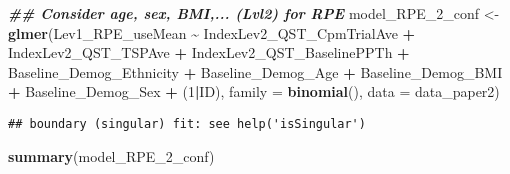 \documentclass[
  12pt,
]{article}
\newenvironment{Shaded}{\begin{snugshade}}{\end{snugshade}}
\newcommand{\AttributeTok}[1]{\textcolor[rgb]{0.13,0.29,0.53}{#1}}
\newcommand{\DecValTok}[1]{\textcolor[rgb]{0.00,0.00,0.81}{#1}}
\newcommand{\DocumentationTok}[1]{\textcolor[rgb]{0.56,0.35,0.01}{\textbf{\textit{#1}}}}
\newcommand{\FunctionTok}[1]{\textcolor[rgb]{0.13,0.29,0.53}{\textbf{#1}}}
\newcommand{\NormalTok}[1]{#1}
\newcommand{\OtherTok}[1]{\textcolor[rgb]{0.56,0.35,0.01}{#1}}
\newcommand{\SpecialCharTok}[1]{\textcolor[rgb]{0.81,0.36,0.00}{\textbf{#1}}}
\begin{document}
\begin{Shaded}
\begin{Highlighting}[]
\DocumentationTok{\#\# Consider age, sex, BMI,... (Lvl2) for RPE}
\NormalTok{model\_RPE\_2\_conf }\OtherTok{\textless{}{-}} \FunctionTok{glmer}\NormalTok{(Lev1\_RPE\_useMean }\SpecialCharTok{\textasciitilde{}}\NormalTok{ IndexLev2\_QST\_CpmTrialAve }\SpecialCharTok{+}\NormalTok{ IndexLev2\_QST\_TSPAve }\SpecialCharTok{+}\NormalTok{ IndexLev2\_QST\_BaselinePPTh }\SpecialCharTok{+}\NormalTok{ Baseline\_Demog\_Ethnicity }\SpecialCharTok{+}\NormalTok{ Baseline\_Demog\_Age }\SpecialCharTok{+}\NormalTok{ Baseline\_Demog\_BMI }\SpecialCharTok{+}\NormalTok{ Baseline\_Demog\_Sex }\SpecialCharTok{+}\NormalTok{ (}\DecValTok{1}\SpecialCharTok{|}\NormalTok{ID), }\AttributeTok{family =} \FunctionTok{binomial}\NormalTok{(), }\AttributeTok{data =}\NormalTok{ data\_paper2)}
\end{Highlighting}
\end{Shaded}

\begin{verbatim}
## boundary (singular) fit: see help('isSingular')
\end{verbatim}

\begin{Shaded}
\begin{Highlighting}[]
\FunctionTok{summary}\NormalTok{(model\_RPE\_2\_conf)}
\end{Highlighting}
\end{Shaded}
\end{document}

